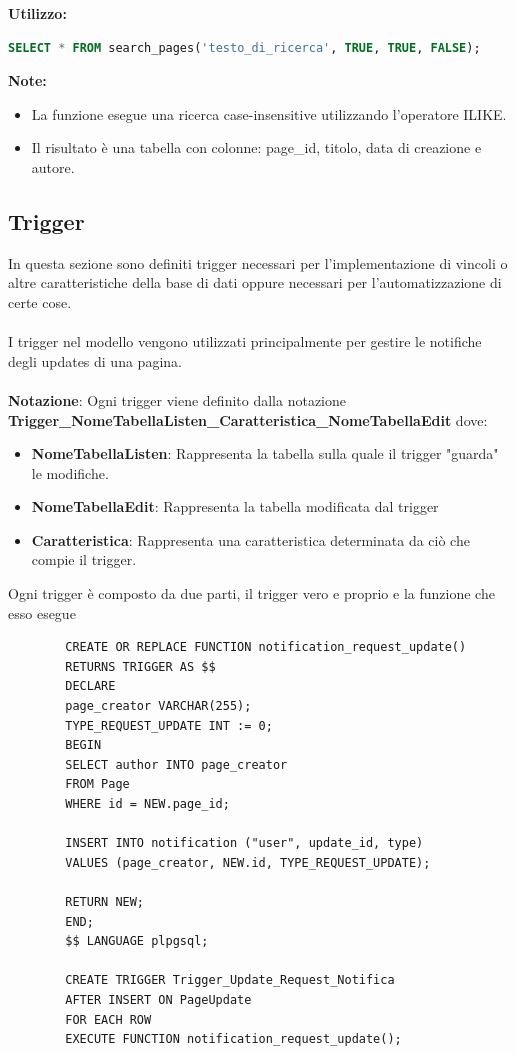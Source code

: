 \documentclass{article}
\begin{document}
	\textbf{Utilizzo:}
	
	\begin{lstlisting}[language=SQL]
		SELECT * FROM search_pages('testo_di_ricerca', TRUE, TRUE, FALSE);
	\end{lstlisting}
	
	\textbf{Note:} \\
	
	\begin{itemize}
		\item La funzione esegue una ricerca case-insensitive utilizzando l'operatore ILIKE.
		\item Il risultato è una tabella con colonne: page\_id, titolo, data di creazione e autore.
	\end{itemize}
	
	\newpage
	
	\subsection{Trigger}
	In questa sezione sono definiti trigger necessari per l'implementazione di vincoli o altre caratteristiche della base di dati oppure necessari per l'automatizzazione di certe cose.\\\\
	I trigger nel modello vengono utilizzati principalmente per gestire le notifiche degli updates di una pagina.\\\\
	\textbf{Notazione}: Ogni trigger viene definito dalla notazione \textbf{Trigger\_NomeTabellaListen\_Caratteristica\_NomeTabellaEdit} dove:
	
	\begin{itemize}
		\item \textbf{NomeTabellaListen}: Rappresenta la tabella sulla quale il trigger "guarda" le modifiche.
		\item \textbf{NomeTabellaEdit}: Rappresenta la tabella modificata dal trigger
		\item \textbf{Caratteristica}: Rappresenta una caratteristica determinata da ci\`o che compie il trigger.
	\end{itemize}
	
	Ogni trigger \`e composto da due parti, il trigger vero e proprio e la funzione che esso esegue
	
	\begin{lstlisting}
		CREATE OR REPLACE FUNCTION notification_request_update()
		RETURNS TRIGGER AS $$
		DECLARE
		page_creator VARCHAR(255);
		TYPE_REQUEST_UPDATE INT := 0;
		BEGIN
		SELECT author INTO page_creator
		FROM Page
		WHERE id = NEW.page_id;
		
		INSERT INTO notification ("user", update_id, type)
		VALUES (page_creator, NEW.id, TYPE_REQUEST_UPDATE);
		
		RETURN NEW;
		END;
		$$ LANGUAGE plpgsql;
		
		CREATE TRIGGER Trigger_Update_Request_Notifica
		AFTER INSERT ON PageUpdate
		FOR EACH ROW
		EXECUTE FUNCTION notification_request_update();
	\end{lstlisting}
	
\end{document}
